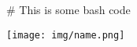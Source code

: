 \begin{bashcode}
# This is some bash code
\end{bashcode}

\begin{center}
\texttt{[image: img/name.png]} \\
\end{center}

\renewcommand{\thesubsection}{\thesection.\alph{subsection}}